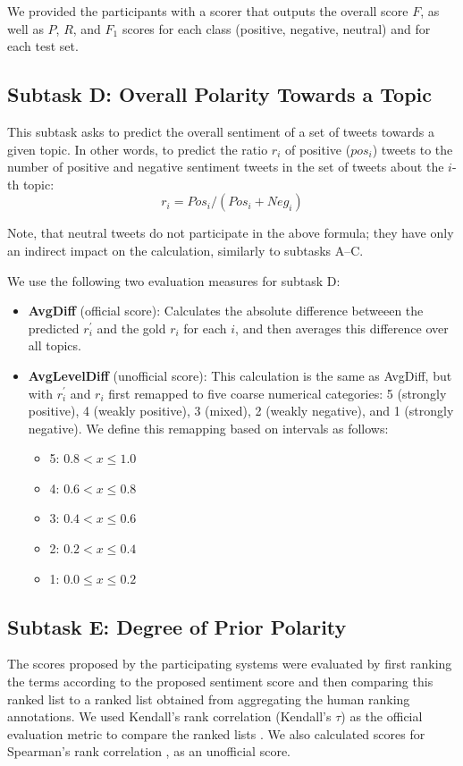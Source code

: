 \documentclass[11pt]{article}
\begin{document}
We provided the participants with a scorer that outputs the overall score $F$,
as well as $P$, $R$, and $F_1$ scores for each class (positive, negative, neutral) and for each test set.


\subsection{Subtask D: Overall Polarity Towards a Topic}

This subtask asks to predict the overall sentiment of a set of tweets towards a given topic.
In other words, to predict the ratio $r_i$ of positive ($pos_i$) tweets
to the number of positive and negative sentiment tweets in the set of tweets
about the $i$-th topic:
$$r_i = Pos_i/(Pos_i+Neg_i)$$

Note, that neutral tweets do not participate in the above formula;
they have only an indirect impact on the calculation,
similarly to subtasks A--C.

We use the following two evaluation measures for subtask D:

\begin{itemize}
\item \textbf{AvgDiff} (official score): Calculates the absolute difference betweeen the predicted $r^\prime_i$ and the gold $r_i$ for each $i$, and then averages this difference over all topics.
\item \textbf{AvgLevelDiff} (unofficial score): This calculation is the same as AvgDiff, but with $r^\prime_i$ and $r_i$ first remapped to five coarse numerical categories: 5 (strongly positive), 4 (weakly positive), 3 (mixed), 2 (weakly negative), and 1 (strongly negative). We define this remapping based on intervals as follows:
\begin{itemize}
\item 5: $0.8 < x \le 1.0$
\item 4: $0.6 < x \le 0.8$
\item 3: $0.4 < x \le 0.6$
\item 2: $0.2 < x \le 0.4$
\item 1: $0.0 \le x \le 0.2$
\end{itemize}
\end{itemize}


\subsection{Subtask E: Degree of Prior Polarity}

The scores proposed by the participating systems were evaluated by first ranking the terms according to the proposed sentiment score and then comparing this ranked list to a ranked list obtained from aggregating the human ranking annotations. We used Kendall's rank correlation  %
(Kendall's $\tau$) as the official evaluation metric to compare the ranked lists \cite{kendall1938new}. We also calculated scores for Spearman's rank correlation \cite{Spearman},
as an unofficial score.
\end{document}
